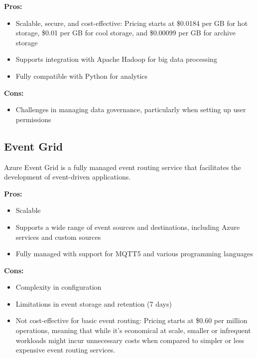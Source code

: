 \textbf{Pros:}
\begin{itemize}
    \item Scalable, secure, and cost-effective: Pricing starts at \$0.0184 per GB for hot storage, \$0.01 per GB for cool storage, and \$0.00099 per GB for archive storage
    \item Supports integration with Apache Hadoop for big data processing
    \item Fully compatible with Python for analytics
\end{itemize}

\textbf{Cons:}
\begin{itemize}
    \item Challenges in managing data governance, particularly when setting up user permissions
\end{itemize}

\subsection*{Event Grid}
\label{azure:event-grid}
Azure Event Grid is a fully managed event routing service that facilitates the development of event-driven applications.

\textbf{Pros:}
\begin{itemize}
    \item Scalable
    \item Supports a wide range of event sources and destinations, including Azure services and custom sources
    \item Fully managed with support for MQTT5 and various programming languages
\end{itemize}

\textbf{Cons:}
\begin{itemize}
    \item Complexity in configuration
    \item Limitations in event storage and retention (7 days)
    \item Not cost-effective for basic event routing: Pricing starts at \$0.60 per million operations, meaning that while it's economical at scale, smaller or infrequent workloads might incur unnecessary costs when compared to simpler or less expensive event routing services.
\end{itemize}

